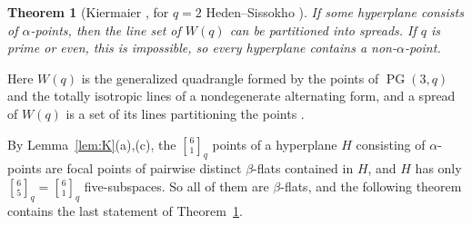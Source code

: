 \documentclass[11pt]{amsart}
\newtheorem{theorem}{Theorem}[section]
\theoremstyle{definition}
\newcommand{\gauss}[3]{\genfrac{[}{]}{0pt}{}{#1}{#2}_{#3}}
\newcommand{\PG}{\operatorname{PG}}
\begin{document}
\begin{theorem}[Kiermaier {\cite[Thms.~1, 2]{Kie22}}, for $q=2$ Heden--Sissokho \cite{HS16}]\label{thm:K}
If some hyperplane consists of $\alpha$-points, then the line set of $W(q)$ can be partitioned into spreads. If $q$ is prime or even, this is impossible, so every hyperplane contains a non-$\alpha$-point.
\end{theorem}

Here $W(q)$ is the generalized quadrangle formed by the points of $\PG(3,q)$ and the totally isotropic lines of a nondegenerate alternating form, and a spread of $W(q)$ is a set of its lines partitioning the points \cite[Sect.~1.1, 1.8 and 3.1.1]{PT09}.

By Lemma~\ref{lem:K}(a),(c), the $\gauss61q$ points of a hyperplane $H$ consisting of $\alpha$-points are focal points of pairwise distinct $\beta$-flats contained in $H$, and $H$ has only $\gauss65q=\gauss61q$ five-subspaces. So all of them are $\beta$-flats, and the following theorem contains the last statement of Theorem~\ref{thm:K}.
\end{document}

